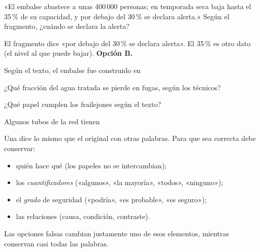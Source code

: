 \begin{reto}
«El embalse abastece a unas 400\,000 personas; en temporada seca baja hasta el 35\,\% de su capacidad, y por debajo del
30\,\% se declara alerta.» Según el fragmento, ¿cuándo se declara la alerta?
\end{reto}

\begin{retoresuelto}
El fragmento dice «por debajo del 30\,\% se declara alerta». El 35\,\% es otro dato (el nivel al que puede bajar).
\textbf{Opción B.}
\end{retoresuelto}

\taller
{}
\begin{ejercicios}
\item Según el texto, el embalse fue construido en
\item ¿Qué fracción del agua tratada se pierde en fugas, según los técnicos?
\item ¿Qué papel cumplen los frailejones según el texto?
\item Algunos tubos de la red tienen
\end{ejercicios}

\bitacora


Una  dice lo mismo que el original con otras palabras. Para que sea correcta debe conservar:
\begin{itemize}
  \item quién hace qué (los papeles no se intercambian);
  \item los \emph{cuantificadores} («algunos», «la mayoría», «todos», «ninguno»);
  \item el \emph{grado} de seguridad («podría», «es probable», «es seguro»);
  \item las relaciones (causa, condición, contraste).
\end{itemize}
Las opciones falsas cambian justamente uno de esos elementos, mientras conservan casi todas las palabras.

